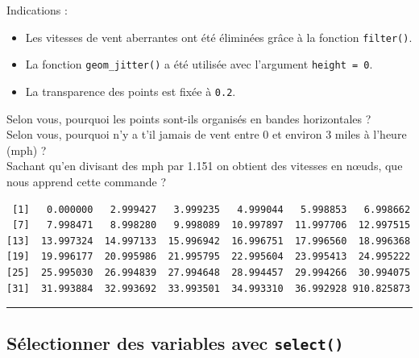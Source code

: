 \documentclass[a4paperpaper,]{article}
\newenvironment{Shaded}{\begin{snugshade}}{\end{snugshade}}
\newcommand{\FloatTok}[1]{\textcolor[rgb]{0.69,0.50,0.00}{#1}}
\newcommand{\KeywordTok}[1]{\textcolor[rgb]{0.12,0.11,0.11}{\textbf{#1}}}
\newcommand{\NormalTok}[1]{\textcolor[rgb]{0.12,0.11,0.11}{#1}}
\newcommand{\OperatorTok}[1]{\textcolor[rgb]{0.12,0.11,0.11}{#1}}
\providecommand{\tightlist}{%
  \setlength{\itemsep}{0pt}\setlength{\parskip}{0pt}}
\begin{document}
Indications :

\begin{itemize}
\tightlist
\item
  Les vitesses de vent aberrantes ont été éliminées grâce à la fonction \texttt{filter()}.
\item
  La fonction \texttt{geom\_jitter()} a été utilisée avec l'argument \texttt{height\ =\ 0}.
\item
  La transparence des points est fixée à \texttt{0.2}.
\end{itemize}

Selon vous, pourquoi les points sont-ils organisés en bandes horizontales ?\\
Selon vous, pourquoi n'y a t'il jamais de vent entre 0 et environ 3 miles à l'heure (mph) ?\\
Sachant qu'en divisant des mph par 1.151 on obtient des vitesses en nœuds, que nous apprend cette commande ?

\begin{Shaded}
\end{Shaded}

\begin{verbatim}
 [1]   0.000000   2.999427   3.999235   4.999044   5.998853   6.998662
 [7]   7.998471   8.998280   9.998089  10.997897  11.997706  12.997515
[13]  13.997324  14.997133  15.996942  16.996751  17.996560  18.996368
[19]  19.996177  20.995986  21.995795  22.995604  23.995413  24.995222
[25]  25.995030  26.994839  27.994648  28.994457  29.994266  30.994075
[31]  31.993884  32.993692  33.993501  34.993310  36.992928 910.825873
\end{verbatim}

\begin{center}\rule{0.5\linewidth}{\linethickness}\end{center}

\hypertarget{selectionner-des-variables-avec-select}{%
\subsection{\texorpdfstring{Sélectionner des variables avec \texttt{select()}}{Sélectionner des variables avec select()}}\label{selectionner-des-variables-avec-select}}
\end{document}
